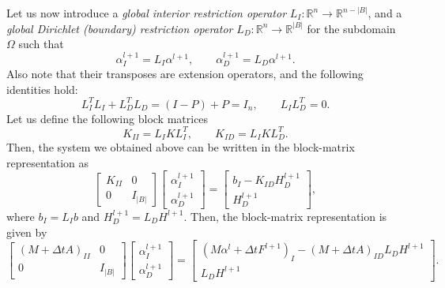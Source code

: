 \documentclass[a4paper, 11pt]{article}
\theoremstyle{plain}
\theoremstyle{definition}
\theoremstyle{remark}
\begin{document}
Let us now introduce a \textit{global interior restriction operator} $L_{I}: \mathbb{R}^{n} \to \mathbb{R}^{n - \lvert B\rvert}$, and a \textit{global Dirichlet (boundary) restriction operator} $L_{D}: \mathbb{R}^{n} \to \mathbb{R}^{\lvert B\rvert}$ for the subdomain $\Omega$ such that
\begin{equation*}
    \alpha_{I}^{l+1} = L_{I}\alpha^{l+1}, \qquad \alpha_{D}^{l+1} = L_{D}\alpha^{l+1}.
\end{equation*}
Also note that their transposes are extension operators, and the following identities hold:
\begin{equation*}
    L_{I}^{T}L_{I} + L_{D}^{T}L_{D} = \left(I - P\right) + P = I_{n}, \qquad L_{I}L_{D}^{T} = 0.
\end{equation*}
Let us define the following block matrices
\begin{equation*}
    K_{II} = L_{I}KL_{I}^{T}, \qquad K_{ID} = L_{I}KL_{D}^{T}.
\end{equation*}
Then, the system we obtained above can be written in the block-matrix representation as 
\begin{equation*}
    \begin{bmatrix}
        K_{II} & 0\\
        0 & I_{\lvert B\rvert}
    \end{bmatrix}
    \begin{bmatrix}
        \alpha_{I}^{l+1}\\[1pt]
        \alpha_{D}^{l+1}
    \end{bmatrix} =
    \begin{bmatrix}
        b_{I} - K_{ID}H^{l+1}_{D}\\
        H^{l+1}_{D}
    \end{bmatrix},
\end{equation*}
where $b_{I} = L_{I}b$ and $H^{l+1}_{D} = L_{D}H^{l+1}$. Then, the block-matrix representation is given by
\begin{equation*}
    \begin{bmatrix}
        \left(M + \Delta t A\right)_{II} & 0\\
        0 & I_{\lvert B\rvert}
    \end{bmatrix}
    \begin{bmatrix}
        \alpha_{I}^{l+1}\\[1pt]
        \alpha_{D}^{l+1}
    \end{bmatrix} = 
    \begin{bmatrix}
        \left(M \alpha^{l} + \Delta tF^{l+1}\right)_{I} - \left(M + \Delta t A\right)_{ID}L_{D}H^{l+1}\\
        L_{D}H^{l+1}
    \end{bmatrix}.
\end{equation*}
\end{document}
